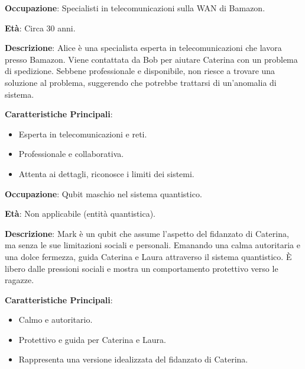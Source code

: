 \begin{tcolorbox}[colback=white,colframe=black,title=\textbf{Alice e Bob}]
\begin{multicols}{2}
\textbf{Occupazione}: Specialisti in telecomunicazioni sulla WAN di Bamazon.

\textbf{Età}: Circa 30 anni.

\textbf{Descrizione}: Alice è una specialista esperta in telecomunicazioni che lavora presso Bamazon. Viene contattata da Bob per aiutare Caterina con un problema di spedizione. Sebbene professionale e disponibile, non riesce a trovare una soluzione al problema, suggerendo che potrebbe trattarsi di un'anomalia di sistema.

\textbf{Caratteristiche Principali}:
\begin{itemize}
    \item Esperta in telecomunicazioni e reti.
    \item Professionale e collaborativa.
    \item Attenta ai dettagli, riconosce i limiti dei sistemi.
\end{itemize}
\end{multicols}
\end{tcolorbox}

\begin{tcolorbox}[colback=white,colframe=black,title=\textbf{Qubit-Mark}]
\begin{multicols}{2}
\textbf{Occupazione}: Qubit maschio nel sistema quantistico.

\textbf{Età}: Non applicabile (entità quantistica).

\textbf{Descrizione}: Mark è un qubit che assume l'aspetto del fidanzato di Caterina, ma senza le sue limitazioni sociali e personali. Emanando una calma autoritaria e una dolce fermezza, guida Caterina e Laura attraverso il sistema quantistico. È libero dalle pressioni sociali e mostra un comportamento protettivo verso le ragazze.

\textbf{Caratteristiche Principali}:
\begin{itemize}
    \item Calmo e autoritario.
    \item Protettivo e guida per Caterina e Laura.
    \item Rappresenta una versione idealizzata del fidanzato di Caterina.
\end{itemize}
\end{multicols}
\end{tcolorbox}

